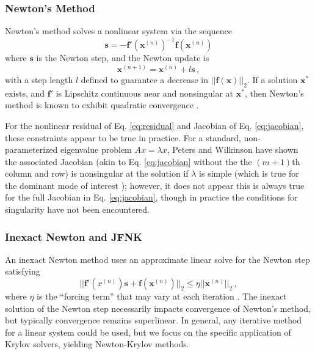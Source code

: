 \subsubsection{Newton's Method}

Newton's method \cite{kelley1995iml} solves a nonlinear system 
via the sequence
\begin{equation}
 \mathbf{s} = -\mathbf{f}'(\mathbf{x}^{(n)})^{-1} \mathbf{f}(\mathbf{x}^{(n)})
 \label{eq:newtonstep}
\end{equation}
where $\mathbf{s}$ is the Newton step, and the Newton update is
\begin{equation}
 \mathbf{x}^{(n+1)} = \mathbf{x}^{(n)} + l \mathbf{s} \, ,
 \label{eq:newtonupdate}
\end{equation}
with a step length $l$ defined to guarantee a decrease in 
$||\mathbf{f(x)}||_2$.  If a solution $\mathbf{x}^*$ exists, 
and $\mathbf{f}'$ is Lipschitz continuous near and nonsingular 
at $\mathbf{x}^*$, then Newton's method is known to exhibit 
quadratic convergence \cite{kelley1995iml}.  

For the nonlinear residual of Eq. \ref{eq:residual} and 
Jacobian of Eq. \ref{eq:jacobian}, these constraints appear to 
be true in practice.  For a standard, non-parameterized eigenvalue 
problem $Ax = \lambda x$, Peters and Wilkinson \cite{peters1979iii} 
have shown the associated Jacobian (akin to Eq. \ref{eq:jacobian} 
without the the $(m+1)$th column and row) is nonsingular at the 
solution if $\lambda$ is simple (which is true for the dominant 
mode of interest \cite{lindahl1981rrm}); however, it does not 
appear this is always true for the full Jacobian in 
Eq. \ref{eq:jacobian}, though in practice the conditions for 
singularity have not been encountered.

\subsubsection{Inexact Newton and JFNK}


An inexact Newton method uses an approximate linear solve for 
the Newton step satisfying 
\begin{equation}
 || \mathbf{f}'({x}^{(n)}) \mathbf{s} + \mathbf{f}(\mathbf{x}^{(n)}) ||_2  
   \le \eta || \mathbf{x}^{(n)} ||_2 \, ,
 \label{eq:inexactnewtonstep}
\end{equation}
where $\eta$ is the ``forcing term'' that may vary at each 
iteration \cite{kelley1995iml}. 
The inexact solution of the Newton step necessarily 
impacts convergence of Newton's method, but typically convergence 
remains superlinear.  In general, any iterative method for a linear 
system could be used, but we focus on the specific application of 
Krylov solvers, yielding Newton-Krylov methods.

